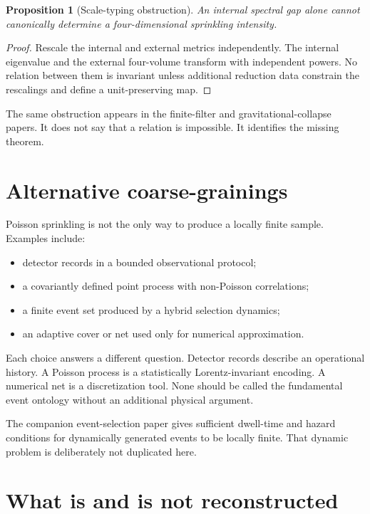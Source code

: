 \documentclass[11pt]{article}
\newtheorem{proposition}[theorem]{Proposition}
\theoremstyle{definition}
\theoremstyle{remark}
\begin{document}
\begin{proposition}[Scale-typing obstruction]
\label{prop:scale}
An internal spectral gap alone cannot canonically determine a
four-dimensional sprinkling intensity.
\end{proposition}

\begin{proof}
Rescale the internal and external metrics independently. The internal
eigenvalue and the external four-volume transform with independent powers.
No relation between them is invariant unless additional reduction data
constrain the rescalings and define a unit-preserving map.
\end{proof}

The same obstruction appears in the finite-filter and gravitational-collapse
papers. It does not say that a relation is impossible. It identifies the
missing theorem.

\section{Alternative coarse-grainings}

Poisson sprinkling is not the only way to produce a locally finite sample.
Examples include:
\begin{itemize}
\item detector records in a bounded observational protocol;
\item a covariantly defined point process with non-Poisson correlations;
\item a finite event set produced by a hybrid selection dynamics;
\item an adaptive cover or net used only for numerical approximation.
\end{itemize}

Each choice answers a different question. Detector records describe an
operational history. A Poisson process is a statistically Lorentz-invariant
encoding. A numerical net is a discretization tool. None should be called
the fundamental event ontology without an additional physical argument.

The companion event-selection paper gives sufficient dwell-time and hazard
conditions for dynamically generated events to be locally finite. That
dynamic problem is deliberately not duplicated here.

\section{What is and is not reconstructed}
\end{document}
